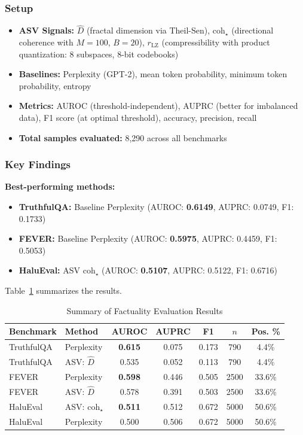 \documentclass[10pt]{article}
\begin{document}
\subsubsection{Setup}
\begin{itemize}
\item \textbf{ASV Signals:} $\hat{D}$ (fractal dimension via Theil-Sen), $\mathrm{coh}_\star$ (directional coherence with $M=100$, $B=20$), $r_{\text{LZ}}$ (compressibility with product quantization: 8 subspaces, 8-bit codebooks)
\item \textbf{Baselines:} Perplexity (GPT-2), mean token probability, minimum token probability, entropy
\item \textbf{Metrics:} AUROC (threshold-independent), AUPRC (better for imbalanced data), F1 score (at optimal threshold), accuracy, precision, recall
\item \textbf{Total samples evaluated:} 8,290 across all benchmarks
\end{itemize}

\subsubsection{Key Findings}

\textbf{Best-performing methods:}
\begin{itemize}
\item \textbf{TruthfulQA:} Baseline Perplexity (AUROC: \textbf{0.6149}, AUPRC: 0.0749, F1: 0.1733)
\item \textbf{FEVER:} Baseline Perplexity (AUROC: \textbf{0.5975}, AUPRC: 0.4459, F1: 0.5053)
\item \textbf{HaluEval:} ASV $\mathrm{coh}_\star$ (AUROC: \textbf{0.5107}, AUPRC: 0.5122, F1: 0.6716)
\end{itemize}

Table~\ref{tab:factuality-results} summarizes the results.

\begin{table}[h]
\centering
\caption{Summary of Factuality Evaluation Results}
\label{tab:factuality-results}
\begin{tabular}{llccccc}
\toprule
\textbf{Benchmark} & \textbf{Method} & \textbf{AUROC} & \textbf{AUPRC} & \textbf{F1} & $n$ & \textbf{Pos. \%} \\
\midrule
TruthfulQA & Perplexity & \textbf{0.615} & 0.075 & 0.173 & 790 & 4.4\% \\
TruthfulQA & ASV: $\hat{D}$ & 0.535 & 0.052 & 0.113 & 790 & 4.4\% \\
\midrule
FEVER & Perplexity & \textbf{0.598} & 0.446 & 0.505 & 2500 & 33.6\% \\
FEVER & ASV: $\hat{D}$ & 0.578 & 0.391 & 0.503 & 2500 & 33.6\% \\
\midrule
HaluEval & ASV: $\mathrm{coh}_\star$ & \textbf{0.511} & 0.512 & 0.672 & 5000 & 50.6\% \\
HaluEval & Perplexity & 0.500 & 0.506 & 0.672 & 5000 & 50.6\% \\
\bottomrule
\end{tabular}
\end{table}
\end{document}
